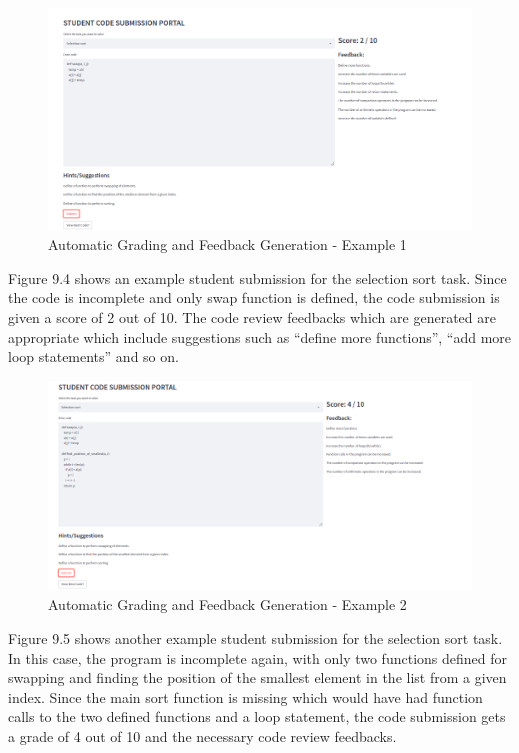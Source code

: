 \begin{figure}[H]
\centering
\includegraphics[scale=0.53,frame]{./figures/dep4.png}
\caption{Automatic Grading and Feedback Generation - Example 1}
\label{fig3}
\end{figure}

Figure 9.4 shows an example student submission for the selection sort
task. Since the code is incomplete and only swap function is defined,
the code submission is given a score of 2 out of 10. The code review
feedbacks which are generated are appropriate which include
suggestions such as ``define more functions'', ``add more loop
statements'' and so on.


\begin{figure}[H]
\centering
\includegraphics[scale=0.51,frame]{./figures/dep5.png}
\caption{Automatic Grading and Feedback Generation - Example 2}
\label{fig4}
\end{figure}

Figure 9.5 shows another example student submission for the selection
sort task. In this case, the program is incomplete again, with only
two functions defined for swapping and finding the position of the
smallest element in the list from a given index. Since the main sort
function is missing which would have had function calls to the two
defined functions and a loop statement, the code submission gets a
grade of 4 out of 10 and the necessary code review feedbacks.

